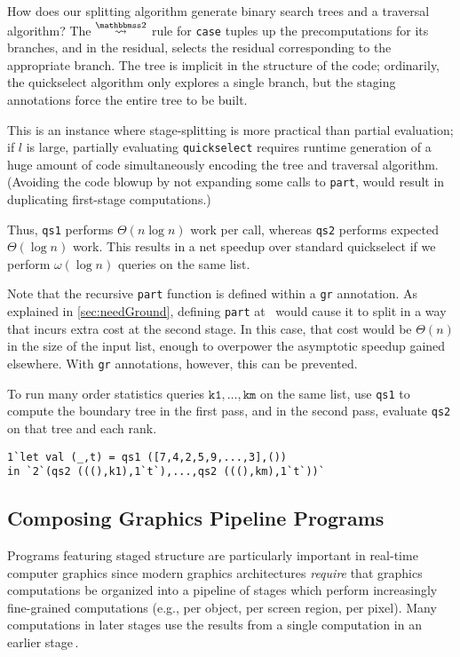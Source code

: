 How does our splitting algorithm generate binary search trees and a traversal
algorithm? The $\splittwosym$ rule for \texttt{case} tuples up the
precomputations for its branches, and in the residual, selects the residual
corresponding to the appropriate branch. The tree is implicit in the structure
of the code; ordinarily, the quickselect algorithm only explores a single
branch, but the staging annotations force the entire tree to be built.

This is an instance where stage-splitting is more practical than partial
evaluation; if $l$ is large, partially evaluating \texttt{quickselect} requires
runtime generation of a huge amount of code simultaneously encoding the tree and
traversal algorithm. (Avoiding the code blowup by not expanding some calls to
\texttt{part}, would result in duplicating first-stage computations.)

Thus, \texttt{qs1} performs $\Theta(n \log n)$ work per call, whereas
\texttt{qs2} performs expected $\Theta(\log n)$ work.  This results in a net
speedup over standard quickselect if we perform $\omega(\log n)$ queries on
the same list. 

Note that the recursive \texttt{part} function is defined within a \texttt{gr}
annotation.  As explained in \ref{sec:needGround}, defining \texttt{part}
at \bbonem\ would cause it to split in a way that incurs extra cost at the second stage.
In this case, that cost would be $\Theta(n)$ in the size of the input list,
enough to overpower the asymptotic speedup gained elsewhere.
With \texttt{gr} annotations, however, this can be prevented.

To run many order statistics queries $\texttt{k1},\dots,\texttt{km}$ on the same
list, use \texttt{qs1} to compute the boundary tree in the first pass, and in
the second pass, evaluate \texttt{qs2} on that tree and each rank.
\begin{lstlisting}
1`let val (_,t) = qs1 ([7,4,2,5,9,...,3],())
in `2`(qs2 (((),k1),1`t`),...,qs2 (((),km),1`t`))`
\end{lstlisting}
%

\subsection{Composing Graphics Pipeline Programs}
\label{sec:graphics}

Programs featuring staged structure are particularly important in
real-time computer graphics since modern graphics architectures
\emph{require} that graphics computations be organized into a pipeline
of stages which perform increasingly fine-grained computations (e.g.,
per object, per screen region, per pixel). Many computations in later
stages use the results from a single computation in an earlier
stage\,\cite{OpenGL4Spec}.

